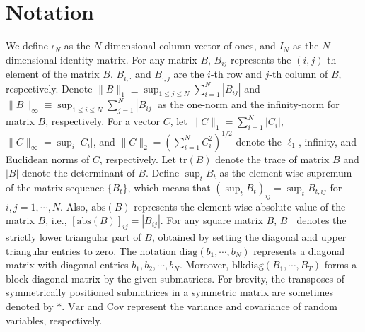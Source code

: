 \documentclass[11pt,a4paper]{article}
\begin{document}

\section*{Notation}
We define $\iota_N$ as the $N$-dimensional column vector of ones, and $I_N$ as the $N$-dimensional identity matrix.
For any matrix $B$, $B_{ij}$ represents the $(i,j)$-th element of the matrix $B$. $B_{i,\cdot}$ and $B_{\cdot,j}$ are the $i$-th row and $j$-th column of $B$, respectively.
Denote $\|B\|_{1}\equiv\sup_{1\leq j\leq N}\sum_{i=1}^N|B_{ij}|$ and $\|B\|_{\infty}\equiv\sup_{1\leq i\leq N}\sum^N_{j=1}|B_{ij}|$ as the one-norm and the infinity-norm for matrix $B$, respectively. 
For a vector \(C\), let
\(\|C\|_1=\sum_{i=1}^N|C_i|\),
\(\|C\|_\infty=\sup_i|C_i|\), and
\(\|C\|_2=(\sum_{i=1}^N C_i^2)^{1/2}\)
denote the \(\ell_1\), infinity, and Euclidean norms of \(C\), respectively.
Let $\mathrm{tr}(B)$ denote the trace of matrix $B$ and $|B|$ denote the determinant of $B$.
Define $\sup_t B_{t}$ as the element-wise supremum of the matrix sequence $\{B_{t}\}$, which means that $(\sup_t B_{t})_{ij}=\sup_t B_{t,ij}$ for $i,j=1,\cdots, N$.
Also, $\mathrm{abs}(B)$ represents the element-wise absolute value of the matrix $B$, i.e., $[\mathrm{abs}(B)]_{ij}=|B_{ij}|$.
For any square matrix $B$, $B^-$ denotes the strictly lower triangular part of $B$, obtained by setting the diagonal and upper triangular entries to zero.
The notation $\mathrm{diag}(b_1,\cdots, b_N)$ represents a diagonal matrix with diagonal entries $b_1,b_2,\cdots,b_N$.
Moreover, $\mathrm{blkdiag}(B_1,\cdots,B_T)$ forms a block-diagonal matrix by the given submatrices.
For brevity, the transposes of symmetrically positioned submatrices in a symmetric matrix are sometimes denoted by $*$.
$\mathrm{Var}$ and $\mathrm{Cov}$ represent the variance and covariance of random variables, respectively.
\end{document}
